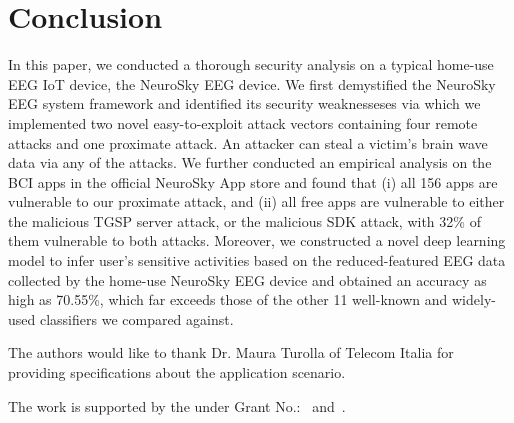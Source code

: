 \section{Conclusion}
\label{sec:conclusion}

In this paper, we conducted a thorough security analysis on a typical home-use EEG IoT device, the NeuroSky EEG device. We first demystified the NeuroSky EEG system framework and identified its security weaknesseses via which we implemented two novel easy-to-exploit attack vectors containing four remote attacks and one proximate attack. An attacker can steal a victim's brain wave data via any of the attacks. We further conducted an empirical analysis on the BCI apps in the official NeuroSky App store and found that (i) all 156 apps are vulnerable to our proximate attack, and (ii) all free apps are vulnerable to either the malicious TGSP server attack, or the malicious SDK attack, with 32\% of them vulnerable to both attacks. Moreover, we constructed a novel deep learning model to infer user's sensitive activities based on the reduced-featured EEG data collected by the home-use NeuroSky EEG device and obtained an accuracy as high as 70.55\%, which far exceeds those of the other 11 well-known and widely-used classifiers we compared against. 


\begin{acks}

The authors would like to thank Dr. Maura Turolla of Telecom
Italia for providing specifications about the application scenario.

The work is supported by the  under Grant
No.:~
and~.


\end{acks}
